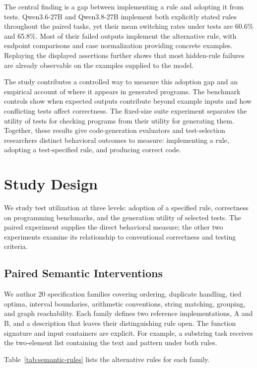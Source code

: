\documentclass[acmsmall,screen,review,anonymous]{acmart}
\begin{document}
The central finding is a gap between implementing a rule and adopting it from tests.
Qwen3.6-27B and Qwen3.8-27B implement both explicitly stated rules throughout the paired tasks, yet their mean switching rates under tests are 60.6\% and 65.8\%.
Most of their failed outputs implement the alternative rule, with endpoint comparisons and case normalization providing concrete examples.
Replaying the displayed assertions further shows that most hidden-rule failures are already observable on the examples supplied to the model.

The study contributes a controlled way to measure this adoption gap and an empirical account of where it appears in generated programs.
The benchmark controls show when expected outputs contribute beyond example inputs and how conflicting tests affect correctness.
The fixed-size suite experiment separates the utility of tests for checking programs from their utility for generating them.
Together, these results give code-generation evaluators and test-selection researchers distinct behavioral outcomes to measure: implementing a rule, adopting a test-specified rule, and producing correct code.

\section{Study Design}

We study test utilization at three levels: adoption of a specified rule, correctness on programming benchmarks, and the generation utility of selected tests.
The paired experiment supplies the direct behavioral measure; the other two experiments examine its relationship to conventional correctness and testing criteria.

\subsection{Paired Semantic Interventions}

We author 20 specification families covering ordering, duplicate handling, tied optima, interval boundaries, arithmetic conventions, string matching, grouping, and graph reachability.
Each family defines two reference implementations, A and B, and a description that leaves their distinguishing rule open.
The function signature and input containers are explicit.
For example, a substring task receives the two-element list containing the text and pattern under both rules.

Table~\ref{tab:semantic-rules} lists the alternative rules for each family.

\end{document}
